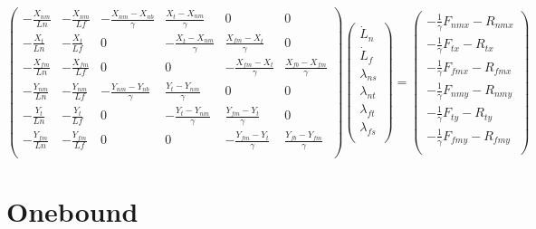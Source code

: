 \documentclass[11pt,twocolumn]{article}
\begin{document}
\[
\begin{pmatrix}
  -\frac{X_{nm}}{Ln} & -\frac{X_{nm}}{Lf}
  & -\frac{X_{nm}-X_{nb}}{\gamma} & \frac{X_{t}-X_{nm}}{\gamma} & 0 & 0\\
  -\frac{X_{t}}{Ln} & -\frac{X_{t}}{Lf}
  & 0 & -\frac{X_{t}-X_{nm}}{\gamma} & \frac{X_{fm}-X_{t}}{\gamma} & 0\\
  -\frac{X_{fm}}{Ln} & -\frac{X_{fm}}{Lf}
  & 0 & 0 & -\frac{X_{fm}-X_{t}}{\gamma} & \frac{X_{fb}-X_{fm}}{\gamma}\\
  -\frac{Y_{nm}}{Ln} & -\frac{Y_{nm}}{Lf}
  & -\frac{Y_{nm}-Y_{nb}}{\gamma} & \frac{Y_{t}-Y_{nm}}{\gamma} & 0 & 0\\
  -\frac{Y_{t}}{Ln} & -\frac{Y_{t}}{Lf}
  & 0 & -\frac{Y_{t}-Y_{nm}}{\gamma} & \frac{Y_{fm}-Y_{t}}{\gamma} & 0\\
  -\frac{Y_{fm}}{Ln} & -\frac{Y_{fm}}{Lf}
  & 0 & 0 & -\frac{Y_{fm}-Y_{t}}{\gamma} & \frac{Y_{fb}-Y_{fm}}{\gamma}\\
\end{pmatrix}
\begin{pmatrix}
  \dot{L}_n\\
  \dot{L}_f\\
  \lambda_{ns}\\
  \lambda_{nt}\\
  \lambda_{ft}\\
  \lambda_{fs}\\
\end{pmatrix}
=
\begin{pmatrix}
  -\frac{1}{\gamma}F_{nmx} - R_{nmx}\\
  -\frac{1}{\gamma}F_{tx}  - R_{tx}\\
  -\frac{1}{\gamma}F_{fmx} - R_{fmx}\\
  -\frac{1}{\gamma}F_{nmy} - R_{nmy}\\
  -\frac{1}{\gamma}F_{ty}  - R_{ty}\\
  -\frac{1}{\gamma}F_{fmy} - R_{fmy}\\
\end{pmatrix}
\]

\section{Onebound}
\end{document}
